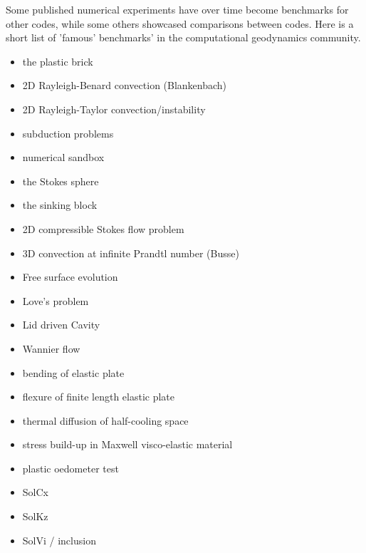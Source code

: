 Some published numerical experiments have over time become benchmarks for other codes, while some 
others showcased comparisons between codes. Here is a short list of 'famous' benchmarks' in the 
computational geodynamics community.

\begin{itemize}
\item the plastic brick \cite{lemm08,kaus10,qurj09}
\item 2D Rayleigh-Benard convection (Blankenbach)  \cite{blbc89,trha98,chhl08,king09,lezh11,vyrc13,trab90}
\item 2D Rayleigh-Taylor convection/instability \cite{pros81,trab90,soga01,bast02,taki03,bomh06, basd08,qurj09,saev10,lezh11,vyrc13,vkks97,bomh06,chtl13} 
\item subduction problems \cite{scbe08,vack08,cehg14}
\item numerical sandbox \cite{bbeg06,busa16}
\item the Stokes sphere \cite{galemanual}
\item the sinking block \cite{thie11,cehg14,gery10,geyu03}
\item 2D compressible Stokes flow problem \cite{lezh08}
\item 3D convection at infinite Prandtl number (Busse) \cite{bucc93,trha98}
\item Free surface evolution \cite{crsg12}
\item Love's problem \cite{bebe04}
\item Lid driven Cavity \cite{bope98,kawa61}
\item Wannier flow \cite{wann50,yemu99}
\item bending of elastic plate \cite{cehg14,boht08a}
\item flexure of finite length elastic plate \cite{chtl13}
\item thermal diffusion of half-cooling space \cite{chtl13}
\item stress build-up in Maxwell visco-elastic material \cite{geyu07,chtl13}
\item plastic oedometer test  \cite{chtl13}
\item SolCx
\item SolKz
\item SolVi / inclusion \cite{kapo06}
\end{itemize}

